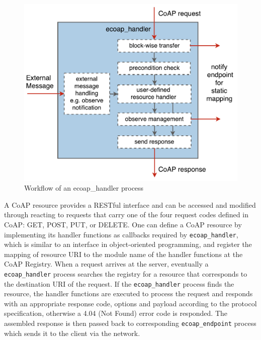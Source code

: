 \begin{figure}[!htbp]
\centering
\includegraphics[scale = 0.55]{ecoap_handler}
\caption{Workflow of an ecoap\_handler process}
\label{fig:ecoap_handler}
\end{figure}

A CoAP resource provides a RESTful interface and can be accessed and modified through reacting to requests that carry one of the four request codes defined in CoAP: GET, POST, PUT, or DELETE. One can define a CoAP resource by implementing its handler functions as callbacks required by \verb|ecoap_handler|, which is similar to an interface in object-oriented programming, and register the mapping of resource URI to the module name of the handler functions at the CoAP Registry. When a request arrives at the server, eventually a \verb|ecoap_handler| process searches the registry for a resource that corresponds to the destination URI of the request. If the \verb|ecoap_handler| process finds the resource, the handler functions are executed to process the request and responds with an appropriate response code, options and payload according to the protocol specification, otherwise a 4.04 (Not Found) error code is responded. The assembled response is then passed back to corresponding \verb|ecoap_endpoint| process which sends it to the client via the network. 

